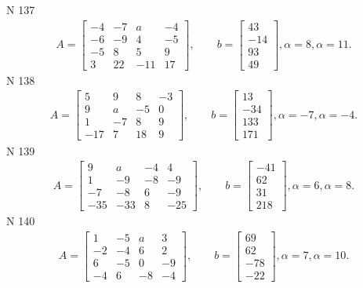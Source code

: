 \documentclass[11pt]{report}
\begin{document}
N 137
\begin{align*}
 A = \left[\begin{matrix}-4 & -7 & a & -4\\-6 & -9 & 4 & -5\\-5 & 8 & 5 & 9\\3 & 22 & -11 & 17\end{matrix}\right],
    \qquad b = \left[\begin{matrix}43\\-14\\93\\49\end{matrix}\right], \alpha = 8, \alpha = 11. 
 \end{align*}
N 138
\begin{align*}
 A = \left[\begin{matrix}5 & 9 & 8 & -3\\9 & a & -5 & 0\\1 & -7 & 8 & 9\\-17 & 7 & 18 & 9\end{matrix}\right],
    \qquad b = \left[\begin{matrix}13\\-34\\133\\171\end{matrix}\right], \alpha = -7, \alpha = -4. 
 \end{align*}
N 139
\begin{align*}
 A = \left[\begin{matrix}9 & a & -4 & 4\\1 & -9 & -8 & -9\\-7 & -8 & 6 & -9\\-35 & -33 & 8 & -25\end{matrix}\right],
    \qquad b = \left[\begin{matrix}-41\\62\\31\\218\end{matrix}\right], \alpha = 6, \alpha = 8. 
 \end{align*}
N 140
\begin{align*}
 A = \left[\begin{matrix}1 & -5 & a & 3\\-2 & -4 & 6 & 2\\6 & -5 & 0 & -9\\-4 & 6 & -8 & -4\end{matrix}\right],
    \qquad b = \left[\begin{matrix}69\\62\\-78\\-22\end{matrix}\right], \alpha = 7, \alpha = 10. 
 \end{align*}
\end{document}
